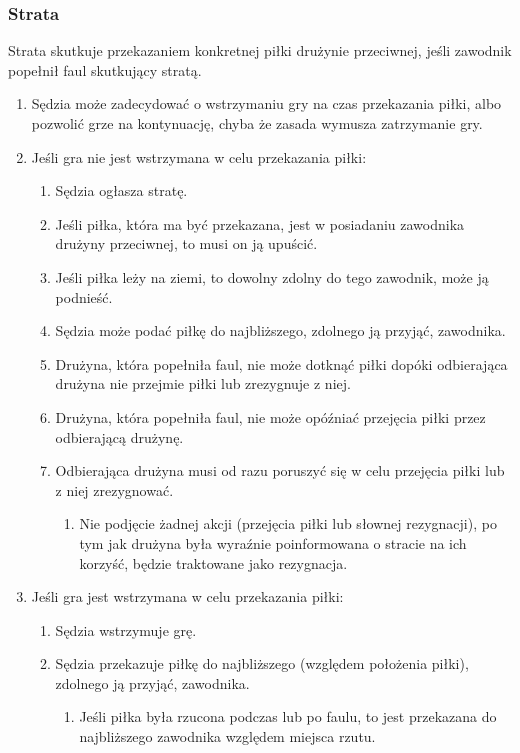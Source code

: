 \documentclass[11pt,a4paper]{article}
\begin{document}
\subsubsection{Strata}
Strata skutkuje przekazaniem konkretnej piłki drużynie przeciwnej, jeśli zawodnik popełnił faul skutkujący stratą.
\begin{enumerate}
  \item Sędzia może zadecydować o wstrzymaniu gry na czas przekazania piłki, albo pozwolić grze na kontynuację, chyba że zasada wymusza zatrzymanie gry.
  \item Jeśli gra nie jest wstrzymana w celu przekazania piłki:
  \begin{enumerate}
    \item Sędzia ogłasza stratę.
    \item Jeśli piłka, która ma być przekazana, jest w posiadaniu zawodnika drużyny przeciwnej, to musi on ją upuścić.
    \item Jeśli piłka leży na ziemi, to dowolny zdolny do tego zawodnik, może ją podnieść.
    \item Sędzia może podać piłkę do najbliższego, zdolnego ją przyjąć, zawodnika.
    \item Drużyna, która popełniła faul, nie może dotknąć piłki dopóki odbierająca drużyna nie przejmie piłki lub zrezygnuje z niej.
    \item Drużyna, która popełniła faul, nie może opóźniać przejęcia piłki przez odbierającą drużynę.
    \item Odbierająca drużyna musi od razu poruszyć się w celu przejęcia piłki lub z niej zrezygnować.
    \begin{enumerate}
      \item Nie podjęcie żadnej akcji (przejęcia piłki lub słownej rezygnacji), po tym jak drużyna była wyraźnie poinformowana o stracie na ich korzyść, będzie traktowane jako rezygnacja. 
    \end{enumerate}
  \end{enumerate}
  \item Jeśli gra jest wstrzymana w celu przekazania piłki:
  \begin{enumerate}
    \item Sędzia wstrzymuje grę.
    \item Sędzia przekazuje piłkę do najbliższego (względem położenia piłki), zdolnego ją przyjąć, zawodnika.
    \begin{enumerate}
      \item Jeśli piłka była rzucona podczas lub po faulu, to jest przekazana do najbliższego zawodnika względem miejsca rzutu.

\end{enumerate}
\end{enumerate}
\end{enumerate}
\end{document}
